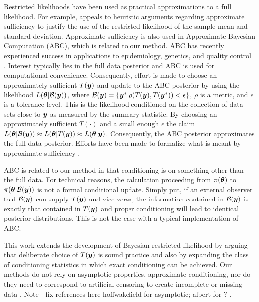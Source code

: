 \documentclass[11pt]{article}
\def\bth{\mbox{\boldmath $\theta$}}
\newcommand{\by}{\mbox{\boldmath $y$}}
\newcommand{\green}[1]{{\color{green}#1}}
\begin{document}
Restricted likelihoods have been used as practical approximations to a full likelihood. For example, \cite{pratt1965} appeals to heuristic arguments regarding approximate sufficiency to justify the use of the restricted likelihood of the sample mean and standard deviation. Approximate sufficiency is also used in Approximate Bayesian Computation (ABC), which is related to our method.  
ABC has recently experienced success in applications to epidemiology, genetics, and quality control \citep[see, for example,][]{tavare1997, pritchard1999,  marjoram2003, fearnhead2012}. Interest typically lies in the full data posterior and ABC is used for computational convenience.  Consequently, effort is made to choose an approximately sufficient $T(\by)$ and update to the ABC posterior by using the likelihood $L(\bth| \mathcal{B}(\by))$, where $\mathcal{B}(\by)=\{\by^{*}|\rho(T(\by),T(\by^{*}))<\epsilon\}$, $\rho$ is a metric, and $\epsilon$ is a tolerance level. This is the likelihood conditioned on the collection of data sets close to $\by$ as measured by the summary statistic. By choosing an approximately sufficient $T(\cdot)$ and a small enough $\epsilon$ the claim $L(\bth|\mathcal{B}(\by))\approx L(\bth|T(\by))\approx L(\bth|\by)$. Consequently, the ABC posterior approximates the full data posterior. Efforts have been made to formalize what is meant by  approximate sufficiency \citep[e.g.,][]{joyce2008}.

ABC is related to our method in that conditioning is on something other than the full data. For technical reasons, the calculation proceeding from $\pi(\bth)$ to $\pi(\bth | \mathcal{B}(\by))$ is not a formal conditional update.  Simply put, if an external observer told $\mathcal{B}(\by)$ can supply $T(\by)$ and vice-versa, the information contained in $\mathcal{B}(\by)$ is exactly that contained in $T(\by)$ and proper conditioning will lead to identical posterior distributions.  This is not the case with a typical implementation of ABC.  


This work extends the development of Bayesian restricted likelihood by arguing that deliberate choice of $T(\by)$ is sound practice and also by expanding the class of conditioning statistics in which exact conditioning can be achieved. Our methods do not rely on asymptotic properties, approximate conditioning, nor do they need to correspond to artificial censoring to create incomplete or missing data \citep[e.g.,][]{albert1988, hoffwakefield2013}.  \green{Note - fix references here hoffwakefield for asymptotic; albert for ? .}  
\end{document}
